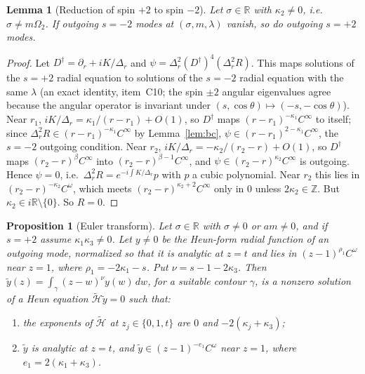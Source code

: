 \documentclass[11pt]{amsart}
\newtheorem{proposition}[theorem]{Proposition}
\newtheorem{lemma}[theorem]{Lemma}
\theoremstyle{definition}
\theoremstyle{remark}
\numberwithin{equation}{section}
\newcommand{\R}{\mathbb{R}}
\newcommand{\Z}{\mathbb{Z}}
\begin{document}
\begin{lemma}[Reduction of spin $+2$ to spin $-2$]\label{lem:TSthr}
Let $\sigma\in\R$ with $\kappa_2\ne0$, i.e.\ $\sigma\ne m\Omega_2$. If outgoing $s=-2$ modes at $(\sigma,m,\lambda)$ vanish, so do
outgoing $s=+2$ modes.
\end{lemma}
\begin{proof}
Let $D^\dagger=\partial_r+iK/\Delta_r$ and $\psi=\Delta_r^2(D^\dagger)^4(\Delta_r^2R)$. This maps solutions of the $s=+2$
radial equation to solutions of the $s=-2$ radial equation with the same $\lambda$ (an exact identity, item~C10; the
spin $\pm2$ angular eigenvalues agree because the angular operator is invariant under $(s,\cos\theta)\mapsto(-s,-\cos\theta)$).
Near $r_1$, $iK/\Delta_r=\kappa_1/(r-r_1)+O(1)$, so $D^\dagger$ maps $(r-r_1)^{-\kappa_1}C^\infty$ to itself; since
$\Delta_r^2R\in(r-r_1)^{-\kappa_1}C^\infty$ by Lemma~\ref{lem:bc}, $\psi\in(r-r_1)^{2-\kappa_1}C^\infty$, the $s=-2$ outgoing
condition. Near $r_2$, $iK/\Delta_r=-\kappa_2/(r_2-r)+O(1)$, so
$D^\dagger$ maps $(r_2-r)^\beta C^\infty$ into $(r_2-r)^{\beta-1}C^\infty$, and $\psi\in(r_2-r)^{\kappa_2}C^\infty$ is
outgoing. Hence $\psi=0$, i.e.\ $\Delta_r^2R=e^{-i\int K/\Delta_r}p$ with $p$ a cubic polynomial. Near $r_2$ this lies
in $(r_2-r)^{-\kappa_2}C^\omega$, which meets $(r_2-r)^{\kappa_2+2}C^\infty$ only in $0$ unless $2\kappa_2\in\Z$. But
$\kappa_2\in i\R\setminus\{0\}$. So $R=0$.
\end{proof}

\begin{proposition}[Euler transform]\label{prop:transform}
Let $\sigma\in\R$ with $\sigma\ne0$ or $am\ne0$, and if $s=+2$ assume $\kappa_1\kappa_3\ne0$. Let $y\ne0$ be the Heun-form radial function of an
outgoing mode, normalized so that it is analytic at $z=t$ and lies in $(z-1)^{\rho_1}C^\omega$ near $z=1$, where
$\rho_1=-2\kappa_1-s$. Put $\nu=s-1-2\kappa_3$. Then $\tilde y(z)=\int_\gamma(z-w)^\nu y(w)\,dw$, for a suitable contour
$\gamma$, is a nonzero solution of a Heun equation $\widetilde{\mathcal H}\tilde y=0$ such that:
\begin{enumerate}[label=(\roman*)]
\item the exponents of $\widetilde{\mathcal H}$ at $z_j\in\{0,1,t\}$ are $0$ and $-2(\kappa_j+\kappa_3)$;
\item $\tilde y$ is analytic at $z=t$, and $\tilde y\in(z-1)^{-e_1}C^\omega$ near $z=1$, where $e_1=2(\kappa_1+\kappa_3)$.
\end{enumerate}
\end{proposition}
\end{document}
